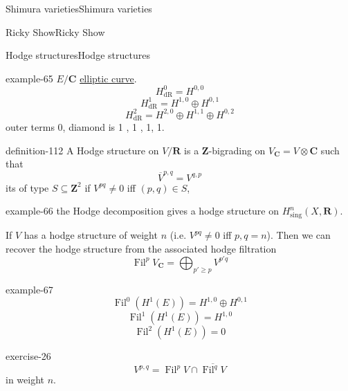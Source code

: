 \documentclass[10pt,]{book}
\numberwithin{equation}{section}
\newcommand{\ZZ}{\mathbf{Z}}
\newcommand{\RR}{\mathbf{R}}
\newcommand{\CC}{\mathbf{C}}
\newcommand{\dR}{\mathrm{dR}}
\DeclareMathOperator{\Fil}{Fil}
\begin{document}
\begin{chapterptx}{Shimura varieties}{}{Shimura varieties}{}{}
\begin{sectionptx}{Ricky Show}{}{Ricky Show}{}{}
\begin{subsectionptx}{Hodge structures}{}{Hodge structures}{}{}
\begin{example}{}{example-65}
\hypertarget{p-1142}{}%
\(E/\CC\) \hyperref[def-supersing-isog-ec]{elliptic curve}.%
\begin{equation*}
H^0_\dR = H^{0,0}
\end{equation*}
%
\begin{equation*}
H^1_\dR = H^{1,0} \oplus H^{0,1}
\end{equation*}
%
\begin{equation*}
H^2_\dR = H^{2,0} \oplus H^{1,1} \oplus H^{0,2}
\end{equation*}
outer terms 0, diamond is  1 , 1 , 1, 1.%
\end{example}
\begin{definition}{}{definition-112}%
\hypertarget{p-1143}{}%
A Hodge structure on \(V/\RR\) is a \(\ZZ\)-bigrading on \(V_\CC = V \otimes \CC\) such that%
\begin{equation*}
\overline V^{p,q}  = V^{q,p}
\end{equation*}
its of type \(S\subseteq \ZZ^2\) if \(V^{pq} \ne 0 \) iff \((p,q) \in S\),%
\end{definition}
\begin{example}{}{example-66}%
\hypertarget{p-1144}{}%
the Hodge decomposition gives a hodge structure on \(H^n_{\mathrm{sing}}(X, \RR)\).%
\end{example}
\hypertarget{p-1145}{}%
If \(V\) has a hodge structure of weight \(n\) (i.e. \(V^{pq} \ne 0\) iff \(p,q = n\)). Then we can recover the hodge structure from the associated hodge filtration%
\begin{equation*}
\Fil^p V_\CC = \bigoplus_{p' \ge p} V^{p' q}
\end{equation*}
%
\begin{example}{}{example-67}%
\hypertarget{p-1146}{}%
%
\begin{equation*}
\Fil^0(H^1(E)) = H^{1,0} \oplus H^{0,1}
\end{equation*}
%
\begin{equation*}
\Fil^1(H^1(E)) = H^{1,0}
\end{equation*}
%
\begin{equation*}
\Fil^2(H^1(E)) = 0
\end{equation*}
%
\end{example}
\begin{inlineexercise}{}{exercise-26}%
\hypertarget{p-1147}{}%
%
\begin{equation*}
V^{p,q} = \Fil^p V \cap \overline {\Fil^q V}
\end{equation*}
in weight \(n\).%
\end{inlineexercise}

\end{subsectionptx}
\end{sectionptx}
\end{chapterptx}
\end{document}
